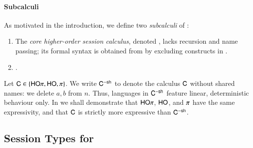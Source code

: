 \documentclass[preprint,11pt]{elsarticle}
\begin{document}
\paragraph{Subcalculi}
As motivated in the introduction, 
we define two \emph{subcalculi} of \HOp: 
\begin{enumerate}[$\bullet$]
	\item	The  
		{\em core higher-order session calculus}, denoted \HO,
		 lacks recursion and name passing; its 
		formal syntax is obtained from  by excluding 
		constructs in .

	\item	{}.

\end{enumerate}
%
Let $\mathsf{C} \in \{\mathsf{HO}\pi, \mathsf{HO}, \pi\}$. We write 
$\mathsf{C}^{-\mathsf{sh}}$ to denote the calculus $\mathsf{C}$ without shared names:
we delete $a,b$ from $n$. 
Thus, languages in $\mathsf{C}^{-\mathsf{sh}}$ feature linear, deterministic behaviour only.
In 
we shall demonstrate that 
$\mathsf{HO}\pi$, $\mathsf{HO}$, and $\pi$ have the same expressivity,
and that $\mathsf{C}$ is strictly more expressive than $\mathsf{C}^{-\mathsf{sh}}$.



\subsection{Session Types for \HOp}
\label{sec:types}
\end{document}
